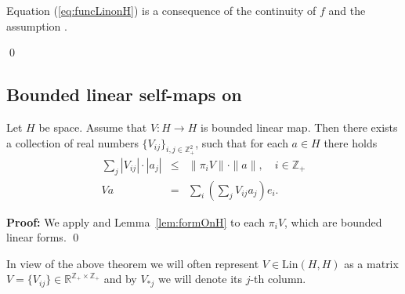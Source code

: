 Equation (\ref{eq:funcLinonH}) is a consequence of the continuity of $f$ and the assumption .

\qed

\subsection{Bounded linear self-maps on \gss}


\begin{theorem}
\label{thm:lin-gss}
Let $H$ be \gss space.
Assume that $V:H \to H$ is bounded linear map. Then there exists a collection of real numbers $\{V_{ij}\}_{i,j \in \mathbb{Z}_+^2}$, such that for each $a \in H$ there holds
\begin{eqnarray*}
  \sum_{j} |V_{ij}| \cdot |a_j| &\leq& \|\pi_i V\| \cdot \|a\|,  \quad i \in \mathbb{Z}_+ \\
  Va &=& \sum_{i} \left(\sum_{j}V_{ij}a_j\right)e_i.
\end{eqnarray*}
\end{theorem}
\textbf{Proof:}
We apply  and Lemma~\ref{lem:formOnH} to each $\pi_i V$, which are bounded linear forms.
\qed

In view of the above theorem we will often represent $V \in \mbox{Lin}(H,H)$ as a matrix  $V=\{V_{ij}\} \in \mathbb{R}^{\mathbb{Z}_+ \times \mathbb{Z}_+}$ and by $V_{\ast j}$ we will denote its $j$-th column.
